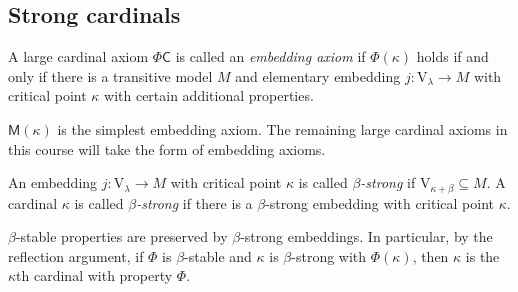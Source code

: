 \subsection{Strong cardinals}
\begin{definition}
    A large cardinal axiom \( \Phi\mathsf{C} \) is called an \emph{embedding axiom} if \( \Phi(\kappa) \) holds if and only if there is a transitive model \( M \) and elementary embedding \( j : \mathrm{V}_\lambda \to M \) with critical point \( \kappa \) with certain additional properties.
\end{definition}
\( \mathsf{M}(\kappa) \) is the simplest embedding axiom.
The remaining large cardinal axioms in this course will take the form of embedding axioms.
\begin{definition}
    An embedding \( j : \mathrm{V}_\lambda \to M \) with critical point \( \kappa \) is called \emph{\( \beta \)-strong} if \( \mathrm{V}_{\kappa + \beta} \subseteq M \).
    A cardinal \( \kappa \) is called \emph{\( \beta \)-strong} if there is a \( \beta \)-strong embedding with critical point \( \kappa \).
\end{definition}
\( \beta \)-stable properties are preserved by \( \beta \)-strong embeddings.
In particular, by the reflection argument, if \( \Phi \) is \( \beta \)-stable and \( \kappa \) is \( \beta \)-strong with \( \Phi(\kappa) \), then \( \kappa \) is the \( \kappa \)th cardinal with property \( \Phi \).

